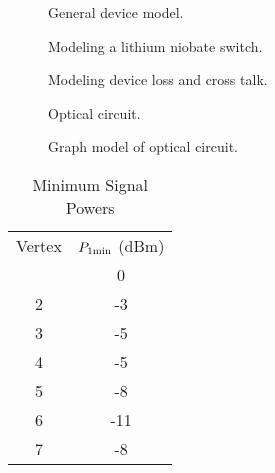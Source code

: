 \begin{figure}
\caption{General device model.}
\end{figure}
\begin{figure}
\caption{Modeling a lithium niobate switch.}
\end{figure}
\begin{figure}
\caption{Modeling device loss and cross talk.}
\end{figure}
\begin{figure}
\caption{Optical circuit.}
\end{figure}
\begin{figure}
\caption{Graph model of optical circuit.}
\end{figure}
\begin{table}
\caption{Minimum Signal Powers}
\begin{tabular}{cc}
Vertex&$P_{1\rm min} $ (dBm) \\ \tableline
  1 &           0   \\
  2 &          -3   \\
  3 &          -5   \\
  4 &          -5   \\
  5 &          -8   \\
  6 &          -11  \\
  7 &          -8
\end{tabular}
\end{table}


